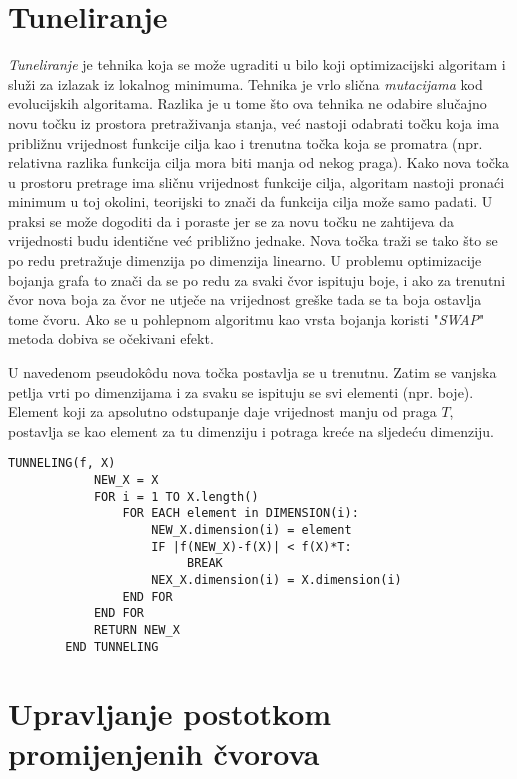 \documentclass[times, utf8, diplomski, numeric]{fer}
\begin{document}
\section{Tuneliranje}

\emph{Tuneliranje} je tehnika koja se može ugraditi u bilo koji optimizacijski algoritam i služi za izlazak iz lokalnog minimuma. Tehnika je vrlo slična \emph{mutacijama} kod evolucijskih algoritama. Razlika je u tome što ova tehnika ne odabire slučajno novu točku iz prostora pretraživanja stanja, već nastoji odabrati točku koja ima približnu vrijednost funkcije cilja kao i trenutna točka koja se promatra (npr. relativna razlika funkcija cilja mora biti manja od nekog praga). Kako nova točka u prostoru pretrage ima sličnu vrijednost funkcije cilja, algoritam nastoji pronaći minimum u toj okolini, teorijski to znači da funkcija cilja može samo padati. U praksi se može dogoditi da i poraste jer se za novu točku ne zahtijeva da vrijednosti budu identične već približno jednake. Nova točka traži se tako što se po redu pretražuje dimenzija po dimenzija linearno. U problemu optimizacije bojanja grafa to znači da se po redu za svaki čvor ispituju boje, i ako za trenutni čvor nova boja za čvor ne utječe na vrijednost greške tada se ta boja ostavlja tome čvoru. Ako se u pohlepnom algoritmu kao vrsta bojanja koristi "\emph{SWAP}" metoda dobiva se očekivani efekt. 

U navedenom pseudok\^{o}du nova točka postavlja se u trenutnu. Zatim se vanjska petlja vrti po dimenzijama i za svaku se ispituju se svi elementi (npr. boje). Element koji za apsolutno odstupanje daje vrijednost manju od praga $T$, postavlja se kao element za tu dimenziju i potraga kreće na sljedeću dimenziju.

\begin{singlespace}
	\begin{lstlisting}[caption=Metoda tuneliranja - implementacija]
		TUNNELING(f, X)
			NEW_X = X
			FOR i = 1 TO X.length()
				FOR EACH element in DIMENSION(i):
					NEW_X.dimension(i) = element
					IF |f(NEW_X)-f(X)| < f(X)*T:
						 BREAK
					NEX_X.dimension(i) = X.dimension(i)
				END FOR
			END FOR
			RETURN NEW_X
		END TUNNELING
	\end{lstlisting}
\end{singlespace}

\section{Upravljanje postotkom promijenjenih čvorova}
\end{document}

